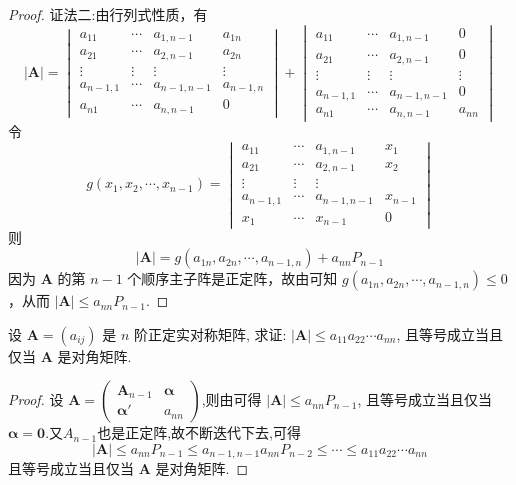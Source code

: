 \documentclass[../../main.tex]{subfiles}%
\begin{document}
\begin{proof}
{\color{blue}证法二:}由行列式性质，有
\[
|\boldsymbol{A}|=\begin{vmatrix}
a_{11}&\cdots&a_{1,n - 1}&a_{1n}\\
a_{21}&\cdots&a_{2,n - 1}&a_{2n}\\
\vdots&\vdots&\vdots&\vdots\\
a_{n - 1,1}&\cdots&a_{n - 1,n - 1}&a_{n - 1,n}\\
a_{n1}&\cdots&a_{n,n - 1}&0
\end{vmatrix}+\begin{vmatrix}
a_{11}&\cdots&a_{1,n - 1}&0\\
a_{21}&\cdots&a_{2,n - 1}&0\\
\vdots&\vdots&\vdots&\vdots\\
a_{n - 1,1}&\cdots&a_{n - 1,n - 1}&0\\
a_{n1}&\cdots&a_{n,n - 1}&a_{nn}
\end{vmatrix}
\]
令
\[
g(x_1,x_2,\cdots,x_{n - 1})=\begin{vmatrix}
a_{11}&\cdots&a_{1,n - 1}&x_1\\
a_{21}&\cdots&a_{2,n - 1}&x_2\\
\vdots&\vdots&\vdots\\
a_{n - 1,1}&\cdots&a_{n - 1,n - 1}&x_{n - 1}\\
x_1&\cdots&x_{n - 1}&0
\end{vmatrix}
\]
则
\[
|\boldsymbol{A}| = g(a_{1n},a_{2n},\cdots,a_{n - 1,n})+a_{nn}P_{n - 1}
\]
因为 \(\boldsymbol{A}\) 的第 \(n - 1\) 个顺序主子阵是正定阵，故由可知 \(g(a_{1n},a_{2n},\cdots,a_{n - 1,n})\leqslant 0\)，从而 \(|\boldsymbol{A}|\leqslant  a_{nn}P_{n - 1}\).

\end{proof}

\begin{corollary}\label{corollary:正定阵的行列式的相关不等式}
设 \(\boldsymbol{A}=(a_{ij})\) 是 \(n\) 阶正定实对称矩阵, 求证: \(|\boldsymbol{A}|\leqslant  a_{11}a_{22}\cdots a_{nn}\), 且等号成立当且仅当 \(\boldsymbol{A}\) 是对角矩阵.
\end{corollary}
\begin{proof}

设 \(\boldsymbol{A}=\begin{pmatrix}\boldsymbol{A}_{n - 1}&\boldsymbol{\alpha}\\\boldsymbol{\alpha}'&a_{nn}\end{pmatrix}\),则由可得 \(|\boldsymbol{A}|\leqslant  a_{nn}P_{n - 1}\), 且等号成立当且仅当 \(\boldsymbol{\alpha}=\boldsymbol{0}\).又$A_{n-1}$也是正定阵,故不断迭代下去,可得
\[|\boldsymbol{A}|\leqslant  a_{nn}P_{n - 1}\leqslant  a_{n - 1,n - 1}a_{nn}P_{n - 2}\leqslant \cdots\leqslant  a_{11}a_{22}\cdots a_{nn}\]
且等号成立当且仅当 \(\boldsymbol{A}\) 是对角矩阵. 

\end{proof}
\end{document}
